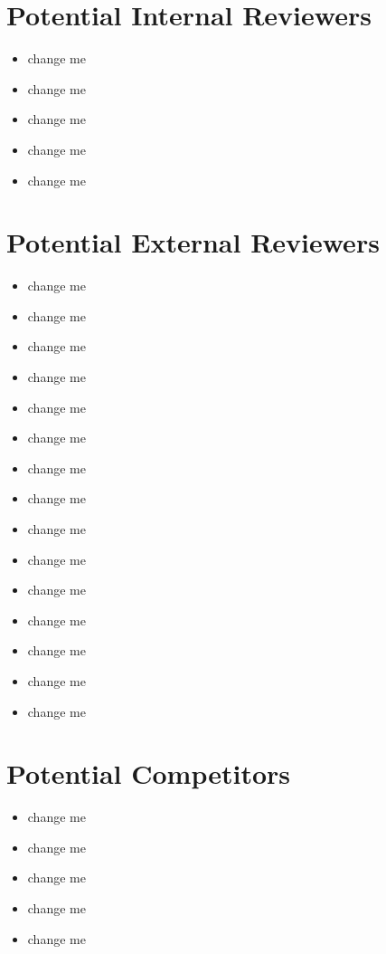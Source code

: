 \documentclass[10pt,letterpaper]{article}
\begin{document}
\section{Potential Internal Reviewers}

\begin{itemize}
\item change me
\item change me
\item change me
\item change me
\item change me
\end{itemize}


\section{Potential External Reviewers}

\begin{itemize}
\item change me
\item change me
\item change me
\item change me
\item change me
\item change me
\item change me
\item change me
\item change me
\item change me
\item change me
\item change me
\item change me
\item change me
\item change me
\end{itemize}


\section{Potential Competitors}

\begin{itemize}
\item change me
\item change me
\item change me
\item change me
\item change me
\end{itemize}
\end{document}
